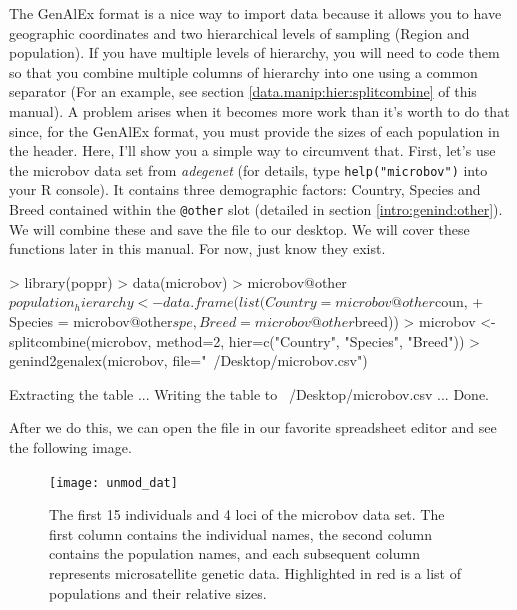 \documentclass[letterpaper]{article}
\newcommand{\tab}{\hspace*{1em}}
\begin{document}
\tab\tab The GenAlEx format is a nice way to import data because it allows you to have geographic coordinates and two hierarchical levels of sampling (Region and population). If you have multiple levels of hierarchy, you will need to code them so that you combine multiple columns of hierarchy into one using a common separator (For an example, see section \ref{data.manip:hier:splitcombine} of this manual). A problem arises when it becomes more work than it's worth to do that since, for the GenAlEx format, you must provide the sizes of each population in the header. Here, I'll show you a simple way to circumvent that. First, let's use the microbov data set from \textit{adegenet} (for details, type \texttt{help("microbov")} into your R console). It contains three demographic factors: Country, Species and Breed contained within the \texttt{@other} slot (detailed in section \ref{intro:genind:other}). We will combine these and save the file to our desktop. We will cover these functions later in this manual. For now, just know they exist.

\begin{Schunk}
\begin{Sinput}
> library(poppr)
> data(microbov)
> microbov@other$population_hierarchy <- data.frame(list(Country = microbov@other$coun, 
+   Species = microbov@other$spe, Breed = microbov@other$breed))
> microbov <- splitcombine(microbov, method=2, hier=c("Country", "Species", "Breed"))
> genind2genalex(microbov, file="~/Desktop/microbov.csv")
\end{Sinput}
\end{Schunk}
\begin{Schunk}
\begin{Soutput}
Extracting the table ... Writing the table to ~/Desktop/microbov.csv ... Done.
\end{Soutput}
\end{Schunk}
After we do this, we can open the file in our favorite spreadsheet editor and see the following image.


\begin{figure}[h!]
  \centering
  \caption{\footnotesize \footnotesize The first 15 individuals and 4 loci of the microbov data set. The first column contains the individual names, the second column contains the population names, and each subsequent column represents microsatellite genetic data. Highlighted in red is a list of populations and their relative sizes.}
  \label{microbov unmodified}
\texttt{[image: unmod\_dat]}
\end{figure}
\end{document}
